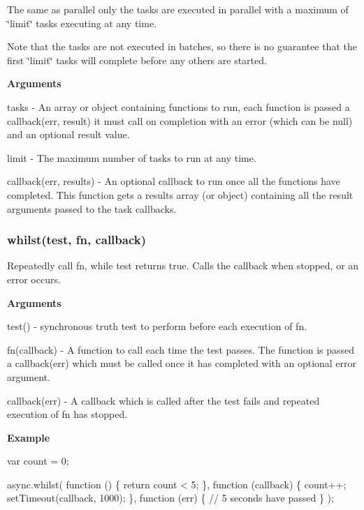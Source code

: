 The same as parallel only the tasks are executed in parallel with a maximum of \char`\"{}limit\char`\"{} tasks executing at any time.

Note that the tasks are not executed in batches, so there is no guarantee that the first \char`\"{}limit\char`\"{} tasks will complete before any others are started.

{\bfseries Arguments}


\begin{DoxyItemize}
\item tasks -\/ An array or object containing functions to run, each function is passed a callback(err, result) it must call on completion with an error (which can be null) and an optional result value.
\item limit -\/ The maximum number of tasks to run at any time.
\item callback(err, results) -\/ An optional callback to run once all the functions have completed. This function gets a results array (or object) containing all the result arguments passed to the task callbacks. 


\end{DoxyItemize}

\label{_whilst}%
 \subsubsection*{whilst(test, fn, callback)}

Repeatedly call fn, while test returns true. Calls the callback when stopped, or an error occurs.

{\bfseries Arguments}


\begin{DoxyItemize}
\item test() -\/ synchronous truth test to perform before each execution of fn.
\item fn(callback) -\/ A function to call each time the test passes. The function is passed a callback(err) which must be called once it has completed with an optional error argument.
\item callback(err) -\/ A callback which is called after the test fails and repeated execution of fn has stopped.
\end{DoxyItemize}

{\bfseries Example}


\begin{DoxyCode}
var count = 0;

async.whilst(
    \textcolor{keyword}{function} () \{ \textcolor{keywordflow}{return} count < 5; \},
    \textcolor{keyword}{function} (callback) \{
        count++;
        setTimeout(callback, 1000);
    \},
    \textcolor{keyword}{function} (err) \{
        \textcolor{comment}{// 5 seconds have passed}
    \}
);
\end{DoxyCode}
 



